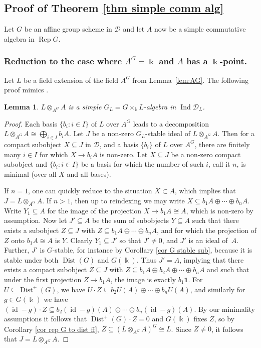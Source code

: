 \documentclass[11pt]{amsart}
\def\id{\operatorname{id}}
\def\Dist{\operatorname{Dist}}
\def\Ind{\operatorname{Ind}}
\def\Ds{\mathscr{D}}
\def\Rep{\operatorname{Rep}}
\def\sub{\subseteq}
\newtheorem{lemma}[thm]{Lemma}
\theoremstyle{definition}
\theoremstyle{remark}
\numberwithin{equation}{section}
\newcommand{\unit}{\mathbf{1}}
\begin{document}
\subsection{Proof of Theorem \ref{thm simple comm alg}} Let $G$ be an affine group scheme in $\Ds$ and let $A$ now be a simple commutative algebra in $\Rep G$. 

\subsubsection{Reduction to the case where $A^G=\Bbbk$ and $A$ has a $\Bbbk$-point.}\label{reduction}   Let $L$ be a field extension of the field $A^G$ from Lemma~\ref{lem:AG}. The following proof mimics \cite[Lem.~4.4]{Magid}.
    \begin{lemma}\label{lemma base change simple}
    $L\otimes_{A^G}A$ is a simple   $G_L=G\times_{\Bbbk}L$-algebra in $\Ind\Ds_L$.  
    \end{lemma}
    \begin{proof}
        Each basis $\{b_i:i\in I\}$ of $L$ over $A^G$ leads to a decomposition $L\otimes_{A^G}A\cong \bigoplus\limits_{i\in I}b_iA$.  Let $J$ be a non-zero $G_{L}$-stable ideal of $L\otimes_{A^G}A$.  Then for a compact subobject $X\sub J$ in $\Ds$, and a basis $\{b_i\}$ of $L$ over $A^G$, there are finitely many $i\in I$ for which $X\to b_iA$ is non-zero.  Let $X\sub J$ be a non-zero compact subobject and $\{b_i:i\in I\}$ be a basis for which the number of such $i$, call it $n$, is minimal (over all $X$ and all bases).  
        
         If $n=1$, one can quickly reduce to the situation $X\subset A$, which implies that $J=L\otimes_{A^G}A$.  If $n>1$, then up to reindexing we may write $X\sub b_1A\oplus\cdots\oplus b_n A$.  Write $Y_1\sub A$ for the image of the projection $X\to b_1A\cong A$, which is non-zero by assumption.   Now let $J'\sub A$ be the sum of subobjects $Y\sub A$ such that there exists a subobject $Z\sub J$ with $Z\sub b_1A\oplus\cdots\oplus b_n A$, and for which the projection of $Z$ onto $b_1A\cong A$ is $Y$. Clearly $Y_1\sub J'$ so that $J'\neq0$, and $J'$ is an ideal of~$A$.  Further, $J'$ is $G$-stable, for instance by Corollary \ref{cor G stable sub}, because it is stable under both $\Dist(G)$ and $G(\Bbbk)$. Thus $J'=A$, implying that there exists a compact subobject $Z\sub J$ with $Z\sub b_1A\oplus b_2A\oplus\cdots\oplus b_nA$ and such that under the first projection $Z\to b_1A$, the image is exactly $b_1\unit$.  For $U\sub\Dist^+(G)$, we have $U\cdot Z\sub b_2U(A)\oplus\cdots\oplus b_nU(A)$, and similarly for $g\in G(\Bbbk)$ we have $(\id-g)\cdot Z\sub b_2(\id-g)(A)\oplus\cdots\oplus b_n(\id-g)(A)$.  By our minimality assumptions it follows that $\Dist^+(G)\cdot Z=0$ and $G(\Bbbk)$ fixes $Z$, so by Corollary \ref{cor rep G to dist ff}, $Z\sub (L\otimes_{A^G}A)^G\cong L$.  Since $Z\neq0$, it follows that $J=L\otimes_{A^G}A$.
            \end{proof}
    
\end{document}
